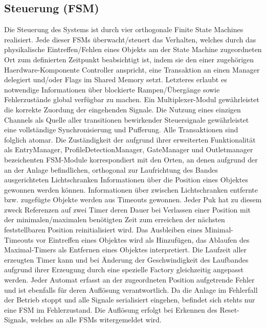 \documentclass[
   draft=false
  ,paper=a4
  ,twoside=true
  ,fontsize=11pt
  ,headsepline
  ,DIV11
  ,parskip=full+
]{scrartcl} %
\begin{document}
\subsection{Steuerung (FSM)}
Die Steuerung des Systems ist durch vier orthogonale Finite State Machines realisiert. Jede dieser FSMs überwacht/steuert das Verhalten, welches durch das physikalische Eintreffen/Fehlen eines Objekts am der State Machine zugeordneten Ort zum definierten Zeitpunkt beabsichtigt ist, indem sie den einer zugehörigen Haerdware-Komponente Controller anspricht, eine Transaktion an einen Manager delegiert und/oder Flags im Shared Memory setzt. Letzteres erlaubt es notwendige Informationen über blockierte Rampen/Übergänge sowie Fehlerzustände global verfügbar zu machen.
\newline
\newline
Ein Multiplexer-Modul gewährleistet die korrekte Zuordung der eingehenden Signale. Die Nutzung eines einzigen Channels als Quelle aller transitionen bewirkender Steuersignale gewährleistet eine vollständige Synchronisierung und Pufferung. Alle Transaktionen sind folglich atomar.
\newline
Die Zuständigkeit der aufgrund ihrer erweiterten Funktionalität als EntryManager, ProfileDetectionManager, GateManager und Outletmanager bezeichenten FSM-Module korrespondiert mit den Orten, an denen aufgrund der an der Anlage befindlichen, orthogonal zur Laufrichtung des Bandes ausgerichteten Lichtschranken Informationen über die Position eines Objektes gewonnen werden können.
\newline
Informationen über zwischen Lichtschranken entfernte bzw. zugefügte Objekte werden aus Timeouts gewonnen. Jeder Puk hat zu diesem zweck Referenzen auf zwei Timer deren Dauer bei Verlassen einer Position mit der minimalen/maximalen benötigten Zeit zum erreichen der nächsten feststellbaren Position reinitialisiert wird.
Das Ausbleiben eines Minimal-Timeouts vor Eintreffen eines Objektes wird als Hinzufügen, das Ablaufen des Maximal-Timers als Entfernen eines Objektes interpretiert. 
\newline
Die Laufzeit aller erzeugten Timer kann und bei Änderung der Geschwindigkeit des Laufbandes aufgrund ihrer Erzeugung durch eine spezielle Factory gleichzeitig angepasst werden.
\newline 
\newline
Jeder Automat erfasst an der zugeordneten Position aufgetrende Fehler und ist ebenfalls für deren Auflösung verantwortlich. Da die Anlage im Fehlerfall der Betrieb stoppt und alle Signale serialisiert eingehen, befindet sich stehts nur eine FSM im Fehlerzustand. Die Auflösung erfolgt bei Erkennen des Reset-Signals, welches an alle FSMs witergemeldet wird.
\end{document}
